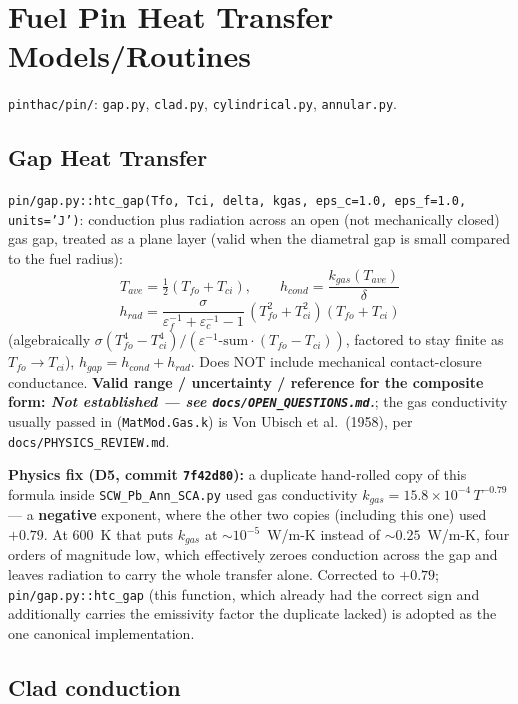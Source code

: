 \documentclass[11pt]{article}
\newcommand{\code}[1]{\texttt{#1}}
\newcommand{\notest}{\textit{Not established --- see \code{docs/OPEN\_QUESTIONS.md}.}}
\begin{document}
\section{Fuel Pin Heat Transfer Models/Routines}

\code{pinthac/pin/}: \code{gap.py}, \code{clad.py}, \code{cylindrical.py},
\code{annular.py}.

\subsection{Gap Heat Transfer}

\code{pin/gap.py::htc\_gap(Tfo, Tci, delta, kgas, eps\_c=1.0, eps\_f=1.0, units='J')}:
conduction plus radiation across an open (not mechanically closed) gas gap, treated as a
plane layer (valid when the diametral gap is small compared to the fuel radius):
\[
  T_{ave} = \tfrac12(T_{fo}+T_{ci}), \qquad h_{cond} = \frac{k_{gas}(T_{ave})}{\delta}
\]
\[
  h_{rad} = \frac{\sigma}{\varepsilon_f^{-1}+\varepsilon_c^{-1}-1}\,(T_{fo}^2+T_{ci}^2)(T_{fo}+T_{ci})
\]
(algebraically $\sigma(T_{fo}^4-T_{ci}^4)/(\varepsilon^{-1}\text{-sum}\cdot(T_{fo}-T_{ci}))$,
factored to stay finite as $T_{fo}\to T_{ci}$), $h_{gap}=h_{cond}+h_{rad}$. Does NOT
include mechanical contact-closure conductance. \textbf{Valid range / uncertainty /
reference for the composite form: \notest{}}; the gas conductivity usually passed in
(\code{MatMod.Gas.k}) is Von Ubisch et al.\ (1958), per \code{docs/PHYSICS\_REVIEW.md}.

\textbf{Physics fix (D5, commit \code{7f42d80}):} a duplicate hand-rolled copy of this
formula inside \code{SCW\_Pb\_Ann\_SCA.py} used gas conductivity
$k_{gas}=15.8\times10^{-4}\,T^{-0.79}$ --- a \textbf{negative} exponent, where the other
two copies (including this one) used $+0.79$. At 600~K that puts $k_{gas}$ at
$\sim10^{-5}$~W/m-K instead of $\sim0.25$~W/m-K, four orders of magnitude low, which
effectively zeroes conduction across the gap and leaves radiation to carry the whole
transfer alone. Corrected to $+0.79$; \code{pin/gap.py::htc\_gap} (this function, which
already had the correct sign and additionally carries the emissivity factor the
duplicate lacked) is adopted as the one canonical implementation.

\subsection{Clad conduction}
\end{document}
